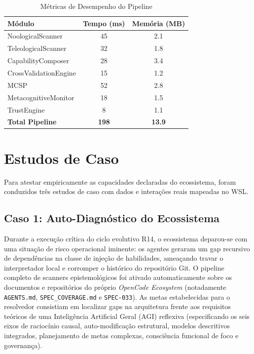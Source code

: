 \documentclass[12pt,a4paper,oneside]{abntex2}
\begin{document}
\begin{table}[H]
\centering
\small
\caption{Métricas de Desempenho do Pipeline}
\label{tab:perf}
\begin{tabular}{lcc}
\toprule
\textbf{Módulo} & \textbf{Tempo (ms)} & \textbf{Memória (MB)} \\
\midrule
NoologicalScanner & 45 & 2.1 \\
TeleologicalScanner & 32 & 1.8 \\
CapabilityComposer & 28 & 3.4 \\
CrossValidationEngine & 15 & 1.2 \\
MCSP & 52 & 2.8 \\
MetacognitiveMonitor & 18 & 1.5 \\
TrustEngine & 8 & 1.1 \\
\midrule
\textbf{Total Pipeline} & \textbf{198} & \textbf{13.9} \\
\bottomrule
\end{tabular}
\end{table}

\section{Estudos de Caso}

Para atestar empiricamente as capacidades declaradas do ecossistema, foram conduzidos três estudos de caso com dados e interações reais mapeadas no WSL.

\subsection{Caso 1: Auto-Diagnóstico do Ecossistema}

Durante a execução crítica do ciclo evolutivo R14, o ecossistema deparou-se com uma situação de risco operacional iminente: os agentes geraram um gap recursivo de dependências na classe de injeção de habilidades, ameaçando travar o interpretador local e corromper o histórico do repositório Git. O pipeline completo de scanners epistemológicos foi ativado automaticamente sobre os documentos e repositórios do próprio \textit{OpenCode Ecosystem} (notadamente \texttt{AGENTS.md}, \texttt{SPEC\_COVERAGE.md} e \texttt{SPEC-033}). As metas estabelecidas para o resolvedor consistiam em localizar gaps na arquitetura frente aos requisitos teóricos de uma Inteligência Artificial Geral (AGI) reflexiva (especificando os seis eixos de raciocínio causal, auto-modificação estrutural, modelos descritivos integrados, planejamento de metas complexas, consciência funcional de foco e governança).
\end{document}
